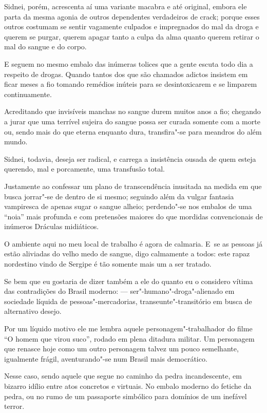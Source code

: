 Sidnei, porém, acrescenta aí uma variante macabra e até original, embora
ele parta da mesma agonia de outros dependentes verdadeiros de crack;
porque esses outros costumam se sentir vagamente culpados e impregnados
do mal da droga e querem se purgar, querem apagar tanto a culpa da alma
quanto querem retirar o mal do sangue e do corpo.

E seguem no mesmo embalo das inúmeras tolices que a gente escuta todo
dia a respeito de drogas. Quando tantos dos que são chamados adictos
insistem em ficar meses a fio tomando remédios inúteis para se
desintoxicarem e se limparem continuamente.

 

Acreditando que invisíveis manchas no sangue durem muitos anos a fio;
chegando a jurar que uma terrível sujeira do sangue possa ser curada
somente com a morte ou, sendo mais do que eterna enquanto dura,
transfira"-se para meandros do além mundo.

Sidnei, todavia, deseja ser radical, e carrega a insistência ousada de
quem esteja querendo, mal e porcamente, uma transfusão total.

Justamente ao confessar um plano de transcendência inusitada na medida
em que busca jorrar"-se de dentro de si mesmo; seguindo além da vulgar
fantasia vampiresca de apenas sugar o sangue alheio; perdendo"-se nos
embalos de uma ``noia'' mais profunda e com pretensões maiores do que
mordidas convencionais de inúmeros Dráculas midiáticos.

\asterisc{}

O ambiente aqui no meu local de trabalho é agora de calmaria. E~se as
pessoas já estão aliviadas do velho medo de sangue, digo calmamente a
todos: este rapaz nordestino vindo de Sergipe é tão somente mais um a
ser tratado.

Se bem que eu gostaria de dizer também a ele do quanto eu o considero
vítima das contradições do Brasil moderno: --- ser"-humano"-droga"-alienado
em sociedade líquida de pessoas"-mercadorias, transeunte"-transitório em
busca de alternativo desejo.

Por um líquido motivo ele me lembra aquele personagem"-trabalhador do
filme ``O homem que virou suco'', rodado em plena ditadura militar. Um
personagem que renasce hoje como um outro personagem talvez um pouco
semelhante, igualmente frágil, aventurando"-se num Brasil mais
democrático.

Nesse caso, sendo aquele que segue no caminho da pedra incandescente, em
bizarro idílio entre atos concretos e virtuais. No embalo moderno do
fetiche da pedra, ou no rumo de um passaporte simbólico para domínios de
um inefável terror.

